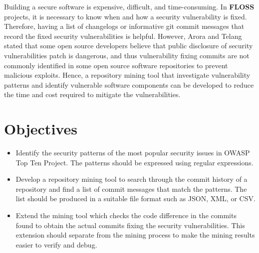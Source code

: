 \documentclass[12pt, a4paper]{report}
\begin{document}
Building a secure software is expensive, difficult, and time-consuming. In \textbf{FLOSS} projects,
it is necessary to know when and how a security vulnerability is fixed. Therefore, having a list of
changelogs or informative git commit messages that record the fixed security vulnerabilities is
helpful. However, Arora and Telang \cite{arora_2005} stated that some open source developers believe
that public disclosure of security vulnerabilities patch is dangerous, and thus vulnerability fixing
commits are not commonly identified in some open source software repositories to prevent malicious
exploits. Hence, a repository mining tool that investigate vulnerability patterns and identify
vulnerable software components can be developed to reduce the time and cost required to mitigate the
vulnerabilities.

\section{Objectives}
\label{sec:objectives}
\begin{itemize}
	\item Identify the security patterns of the most popular security issues in OWASP Top Ten Project.
	The patterns should be expressed using regular expressions.
	\item Develop a repository mining tool to search through the commit history of a repository and
	find a list of commit messages that match the patterns. The list should be produced in a suitable
	file format such as JSON, XML, or CSV.
	\item Extend the mining tool which checks the code difference in the commits found to obtain the
	actual commits fixing the security vulnerabilities. This extension should separate from the mining
	process to make the mining results easier to verify and debug.
\end{itemize}
\end{document}

